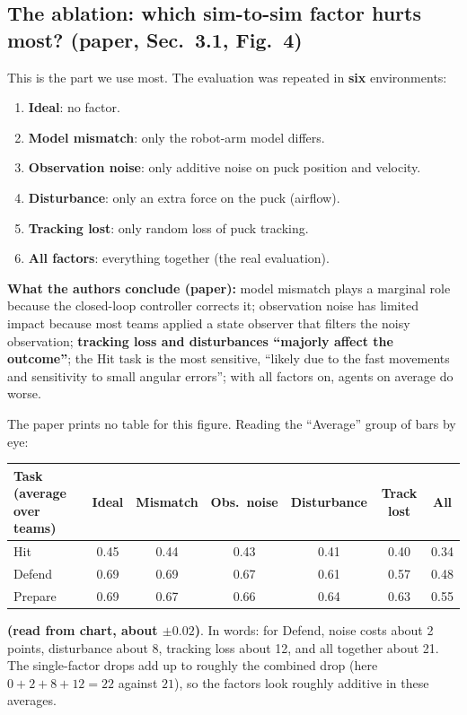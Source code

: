 \documentclass[11pt,a4paper]{article}
\begin{document}
\subsection{The ablation: which sim-to-sim factor hurts most? (paper, Sec.~3.1, Fig.~4)}
\label{sec:ablation}
This is the part we use most. The evaluation was repeated in \textbf{six} environments:
\begin{enumerate}
\item \textbf{Ideal}: no factor.
\item \textbf{Model mismatch}: only the robot-arm model differs.
\item \textbf{Observation noise}: only additive noise on puck position and velocity.
\item \textbf{Disturbance}: only an extra force on the puck (airflow).
\item \textbf{Tracking lost}: only random loss of puck tracking.
\item \textbf{All factors}: everything together (the real evaluation).
\end{enumerate}
\textbf{What the authors conclude (paper):} model mismatch plays a marginal role because the
closed-loop controller corrects it; observation noise has limited impact because most teams
applied a state observer that filters the noisy observation; \textbf{tracking loss and
disturbances ``majorly affect the outcome''}; the Hit task is the most sensitive, ``likely due to
the fast movements and sensitivity to small angular errors''; with all factors on, agents on
average do worse.

The paper prints no table for this figure. Reading the ``Average'' group of bars by eye:

\begin{center}
\small
\begin{tabular}{@{}lcccccc@{}}
\toprule
Task (average over teams) & Ideal & Mismatch & Obs.\ noise & Disturbance & Track lost & All \\
\midrule
Hit & 0.45 & 0.44 & 0.43 & 0.41 & 0.40 & 0.34 \\
Defend & 0.69 & 0.69 & 0.67 & 0.61 & 0.57 & 0.48 \\
Prepare & 0.69 & 0.67 & 0.66 & 0.64 & 0.63 & 0.55 \\
\bottomrule
\end{tabular}
\end{center}
\textbf{(read from chart, about $\pm0.02$)}. In words: for Defend, noise costs about 2 points,
disturbance about 8, tracking loss about 12, and all together about 21. The single-factor drops
add up to roughly the combined drop (here $0+2+8+12=22$ against $21$), so the factors look
roughly additive in these averages.
\end{document}
